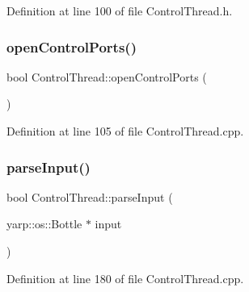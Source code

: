 Definition at line 100 of file Control\+Thread.\+h.

\hypertarget{classocra__recipes_1_1ControlThread_af7612ae9f2da601a24df863f4ff6e2a5}{}\label{classocra__recipes_1_1ControlThread_af7612ae9f2da601a24df863f4ff6e2a5} 
\subsubsection{\texorpdfstring{open\+Control\+Ports()}{openControlPorts()}}
{\footnotesize\ttfamily bool Control\+Thread\+::open\+Control\+Ports (\begin{DoxyParamCaption}{ }\end{DoxyParamCaption})\hspace{0.3cm}{\ttfamily [protected]}}



Definition at line 105 of file Control\+Thread.\+cpp.

\hypertarget{classocra__recipes_1_1ControlThread_a1e13b4ab213e0f72b65aa17095d001fb}{}\label{classocra__recipes_1_1ControlThread_a1e13b4ab213e0f72b65aa17095d001fb} 
\subsubsection{\texorpdfstring{parse\+Input()}{parseInput()}}
{\footnotesize\ttfamily bool Control\+Thread\+::parse\+Input (\begin{DoxyParamCaption}\item[{yarp\+::os\+::\+Bottle $\ast$}]{input }\end{DoxyParamCaption})\hspace{0.3cm}{\ttfamily [protected]}}



Definition at line 180 of file Control\+Thread.\+cpp.

\hypertarget{classocra__recipes_1_1ControlThread_aa86fb4137489b8bd8bd2ac32b737b58f}{}\label{classocra__recipes_1_1ControlThread_aa86fb4137489b8bd8bd2ac32b737b58f} 
